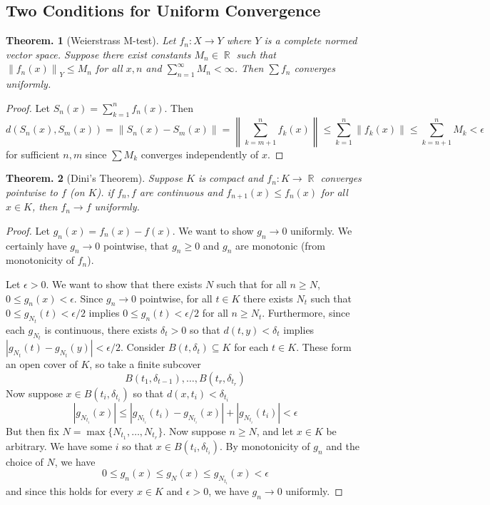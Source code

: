\documentclass[11pt, a4paper]{memoir}
\DeclareMathOperator{\R}{{\mathbb{R}}}
\newcommand{\norm}[1]{\ensuremath{\left\lVert#1\right\rVert}}
\theoremstyle{change}
\newtheorem{theorem}{Theorem.}[section]
\theoremstyle{plain}
\theoremstyle{nonumberplain}
\newtheorem{proof}{Proof}
\numberwithin{equation}{section}
\begin{document}
\subsection{Two Conditions for Uniform Convergence}
\begin{theorem}[Weierstrass M-test]
    Let $f_n:X\to Y$ where $Y$ is a complete normed vector space. Suppose there exist constants $M_n\in\R$ such that
    $\norm{f_n(x)}_Y\leq M_n$ for all $x,n$ and $\sum\limits_{n=1}^\infty M_n<\infty$. Then $\sum f_n$ converges
    uniformly.
\end{theorem}
\begin{proof}
    Let $S_n(x)=\sum\limits_{k=1}^n f_n(x)$. Then
    \[d(S_n(x),S_m(x))=\norm{S_n(x)-S_m(x)}=\norm{\sum\limits_{k=m+1}^n f_k(x)}\leq\sum\limits_{k=1}^n\norm{f_k(x)}\leq\sum\limits_{k=n+1}^n M_k<\epsilon\]
    for sufficient $n,m$ since $\sum M_k$ converges independently of $x$.
\end{proof}
\begin{theorem}[Dini's Theorem]
    Suppose $K$ is compact and $f_n:K\to\R$ converges pointwise to $f$ (on $K$). if $f_n,f$ are continuous and $f_{n+1}(x)\leq f_n(x)$
    for all $x\in K$, then $f_n\to f$ uniformly.
\end{theorem}
\begin{proof}
    Let $g_n(x)=f_n(x)-f(x)$.
    We want to show $g_n\to 0$ uniformly.
    We certainly have $g_n\to 0$ pointwise, that $g_n\geq 0$ and $g_n$ are monotonic (from monotonicity of $f_n$).

    Let $\epsilon>0$.
    We want to show that there exists $N$ such that for all $n\geq N$, $0\leq g_n(x)<\epsilon$.
    Since $g_n\to 0$ pointwise, for all $t\in K$ there exists $N_t$ such that $0\leq g_{N_t}(t)<\epsilon/2$ implies $0\leq g_n(t)<\epsilon/2$ for all $n\geq N_t$.
    Furthermore, since each $g_{N_t}$ is continuous, there exists $\delta_t>0$ so that $d(t,y)<\delta_t$ implies $|g_{N_t}(t)-g_{N_t}(y)|<\epsilon/2$.
    Consider $B(t,\delta_t)\subseteq K$ for each $t\in K$.
    These form an open cover of $K$, so take a finite subcover
    \[B(t_1,\delta_{t-1}),\ldots,B(t_r,\delta_{t_r})\]
    Now suppose $x\in B(t_i,\delta_{t_i})$ so that $d(x,t_i)<\delta_{t_i}$
    \[|g_{N_{t_i}}(x)|\leq |g_{N_{t_i}}(t_i)-g_{N_{t_i}}(x)|+|g_{N_{t_i}}(t_i)|<\epsilon\]
    But then fix $N=\max\{N_{t_1},\ldots,N_{t_r}\}$.
    Now suppose $n\geq N$, and let $x\in K$ be arbitrary.
    We have some $i$ so that $x\in B(t_i,\delta_{t_i})$.
    By monotonicity of $g_n$ and the choice of $N$, we have
    \[0\leq g_n(x)\leq g_N(x)\leq g_{N_{t_i}}(x)<\epsilon\]
    and since this holds for every $x\in K$ and $\epsilon>0$, we have $g_n\to 0$ uniformly.
\end{proof}
\end{document}
